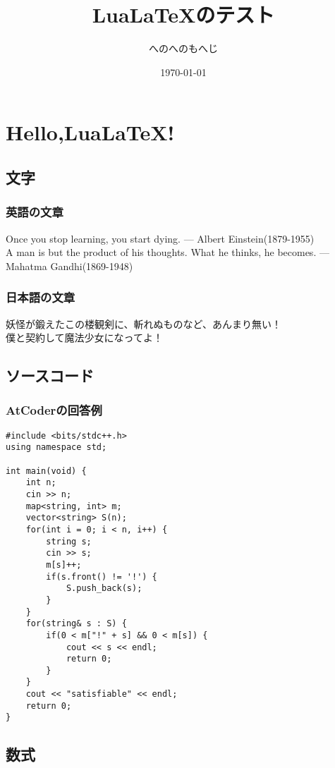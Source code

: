 \documentclass[report,a4paper,titlepage]{jlreq}
\begin{document}
\title{Lua\LaTeX のテスト}
\author{へのへのもへじ}
\date{\today}
\maketitle

\chapter{Hello,Lua\LaTeX !}
\section{文字}
\subsection{英語の文章}
\noindent
Once you stop learning, you start dying. --- Albert Einstein(1879-1955)\\
\textsf{A man is but the product of his thoughts. What he thinks, he becomes.
    ---　Mahatma Gandhi(1869-1948)}
\subsection{日本語の文章}
\noindent
妖怪が鍛えたこの楼観剣に、斬れぬものなど、あんまり無い！\\
{\sffamily 僕と契約して魔法少女になってよ！}\\

\section{ソースコード}
\subsection{AtCoderの回答例}
\begin{lstlisting}[caption = ABC187 C問題回答例(C++)]
#include <bits/stdc++.h>
using namespace std;

int main(void) {
	int n;
	cin >> n;
	map<string, int> m;
	vector<string> S(n);
	for(int i = 0; i < n, i++) {
		string s;
		cin >> s;
		m[s]++;
		if(s.front() != '!') {
			S.push_back(s);
		}
	}
	for(string& s : S) {
		if(0 < m["!" + s] && 0 < m[s]) {
			cout << s << endl;
			return 0;
		}
	}
	cout << "satisfiable" << endl;
	return 0;
}
\end{lstlisting}

\section{数式}
\end{document}
